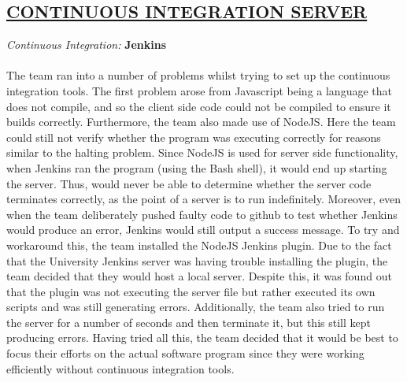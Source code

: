 \documentclass[paper=a4,fontsize=11pt]{article}
\newcommand{\SectionPart}[1]{\subsection*{\uppercase{#1}}}
\begin{document}
\SectionPart{\ul{Continuous Integration Server}}
\hfill \textit{Continuous Integration:} \textbf{Jenkins} \\
\\
The team ran into a number of problems whilst trying to set up the continuous integration tools.
The first problem arose from Javascript being a language that does not compile, and so
the client side code could not be compiled to ensure it
builds correctly. Furthermore, the team also made use of NodeJS. Here
the team could still not verify whether the program was executing correctly for reasons
similar to the halting problem. Since NodeJS is used for server side
functionality, when Jenkins ran the program (using the Bash shell), it would end
up starting the server. Thus, would never be able to determine whether the server
code terminates correctly, as the point of a server is to run indefinitely.
Moreover, even when the team deliberately pushed faulty code to github to test whether Jenkins would produce an error,
Jenkins would still output a success message.
To try and workaround this, the team installed the NodeJS Jenkins plugin.
Due to the fact that the University Jenkins server was having trouble installing the plugin,
the team decided that they would host a local server. Despite this, it was found out that the plugin was not executing the server file
but rather executed its own scripts and was still generating errors.
Additionally, the team also tried to run the server for a number of seconds and then terminate it, but this still kept producing errors.
Having tried all this, the team decided that it would be best to focus their efforts on the actual software program
since they were working efficiently without continuous integration tools.\\
\end{document}
